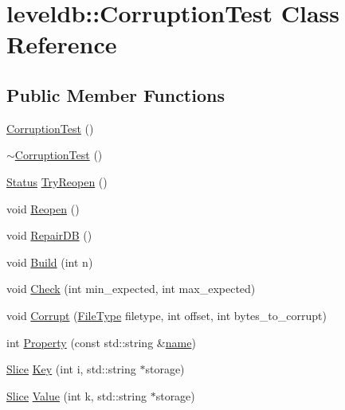 \hypertarget{classleveldb_1_1_corruption_test}{}\section{leveldb\+:\+:Corruption\+Test Class Reference}
\label{classleveldb_1_1_corruption_test}
\subsection*{Public Member Functions}
\begin{DoxyCompactItemize}
\item 
\hyperlink{classleveldb_1_1_corruption_test_a9940767db260b1e4e60b8bcedc50217c}{Corruption\+Test} ()
\item 
\hyperlink{classleveldb_1_1_corruption_test_a4086f02f771d78d4ce242c14b0e392d9}{$\sim$\+Corruption\+Test} ()
\item 
\hyperlink{classleveldb_1_1_status}{Status} \hyperlink{classleveldb_1_1_corruption_test_aaba7c05f06400ef45d1af5cb95f66a57}{Try\+Reopen} ()
\item 
void \hyperlink{classleveldb_1_1_corruption_test_aa2051faee6b6542d35ebdcf99918a713}{Reopen} ()
\item 
void \hyperlink{classleveldb_1_1_corruption_test_aff36b45496c39a006a14df201ef7d57b}{Repair\+D\+B} ()
\item 
void \hyperlink{classleveldb_1_1_corruption_test_a54d2114311c61356e879b5ccfc3cda18}{Build} (int n)
\item 
void \hyperlink{classleveldb_1_1_corruption_test_aa03dcde1d0771ebbcf7d6ac8bda9c725}{Check} (int min\+\_\+expected, int max\+\_\+expected)
\item 
void \hyperlink{classleveldb_1_1_corruption_test_a22060ac0a3697640cdcf36973339b646}{Corrupt} (\hyperlink{namespaceleveldb_ab8e559ac5cadcb2b5dd531c60df944f1}{File\+Type} filetype, int offset, int bytes\+\_\+to\+\_\+corrupt)
\item 
int \hyperlink{classleveldb_1_1_corruption_test_aab1ed767d1cdac7e95a32ccf6defc709}{Property} (const std\+::string \&\hyperlink{testharness_8cc_a8f8f80d37794cde9472343e4487ba3eb}{name})
\item 
\hyperlink{classleveldb_1_1_slice}{Slice} \hyperlink{classleveldb_1_1_corruption_test_a157c0095fca3c0a2ccaf3b8647705469}{Key} (int i, std\+::string $\ast$storage)
\item 
\hyperlink{classleveldb_1_1_slice}{Slice} \hyperlink{classleveldb_1_1_corruption_test_a0afb6030faf43287b86e027a13eac152}{Value} (int k, std\+::string $\ast$storage)
\end{DoxyCompactItemize}
